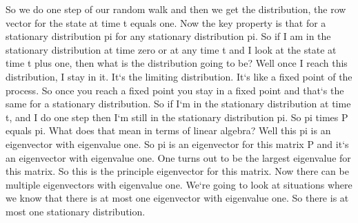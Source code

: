 So we do one step of our random walk and then we get the distribution, the row vector for the state at time t equals one.
Now the key property is that for a stationary distribution pi for any stationary distribution pi.
So if I am in the stationary distribution at time zero or at any time t and I look at the state at time t plus one, then what is the distribution going to be? Well once I reach this distribution, I stay in it.
It`s the limiting distribution.
It`s like a fixed point of the process.
So once you reach a fixed point you stay in a fixed point and that`s the same for a stationary distribution.
So if I`m in the stationary distribution at time t, and I do one step then I`m still in the stationary distribution pi.
So pi times P equals pi.
What does that mean in terms of linear algebra? Well this pi is an eigenvector with eigenvalue one.
So pi is an eigenvector for this matrix P and it`s an eigenvector with eigenvalue one.
One turns out to be the largest eigenvalue for this matrix.
So this is the principle eigenvector for this matrix.
Now there can be multiple eigenvectors with eigenvalue one.
We`re going to look at situations where we know that there is at most one eigenvector with eigenvalue one.
So there is at most one stationary distribution.

